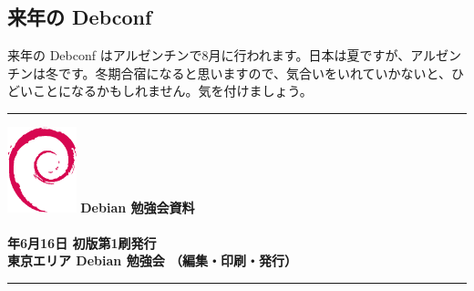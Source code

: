 \documentclass[mingoth,a4paper]{jsarticle}
\newcommand{\debmtgyear}{2007}
\newcommand{\debmtgdate}{16}
\newcommand{\debmtgmonth}{6}
\begin{document}
\subsection{来年の Debconf}

来年の Debconf はアルゼンチンで8月に行われます。日本は夏ですが、アルゼン
チンは冬です。冬期合宿になると思いますので、気合いをいれていかないと、ひ
どいことになるかもしれません。気を付けましょう。

\cleartooddpage

\begin{minipage}[b]{0.2\hsize}
 \colorbox{dancerlightblue}{}
\end{minipage}
\begin{minipage}[b]{0.8\hsize}

\vspace*{15cm}
\hrule
\vspace{2mm}
\includegraphics[width=2cm]{image200502/openlogo-nd.eps}
\noindent \Large \bf Debian 勉強会資料\\ \\
\noindent \normalfont \debmtgyear{}年\debmtgmonth{}月\debmtgdate{}日 \hspace{5mm}  初版第1刷発行\\
\noindent \normalfont 東京エリア Debian 勉強会 （編集・印刷・発行）\\
\hrule
\end{minipage}
\end{document}
